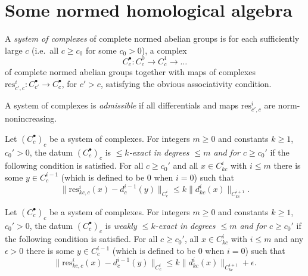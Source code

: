 \section{Some normed homological algebra}%
\label{sec:some_normed_homological_algebra}


\begin{definition}
  \label{system_of_complexes}
  \leanok
  A \emph{system of complexes} of complete normed abelian groups
  is for each sufficiently large $c$ (i.e.~all $c\geq c_0$ for some $c_0>0$),
  a complex
  \[
  C_c^\bullet: C_c^0\to C_c^1\to\ldots
  \]
  of complete normed abelian groups
  together with maps of complexes
  $\mathrm{res}_{c',c}^i: C_{c'}^\bullet\to C_c^\bullet$,
  for $c'>c$,
  satisfying the obvious associativity condition.
\end{definition}

\begin{definition}
  \label{admissible}
  \leanok
  A system of complexes is \emph{admissible}
  if all differentials and maps $\mathrm{res}_{c',c}^i$ are norm-nonincreasing.
\end{definition}

\begin{definition}
  \label{is_bdd_exact_for_bdd_degree_above_idx}
  \leanok
  Let $(C_c^\bullet)_c$ be a system of complexes.
  For integers $m\geq 0$ and constants $k \ge 1$, $c_0'>0$,
  the datum $(C_c^\bullet)_c$ is
  \emph{$\leq k$-exact in degrees $\leq m$ and for $c\geq c_0'$} if the following condition is satisfied.
  For all $c\geq c_0'$ and all $x\in C_{kc}^i$ with $i\leq m$
  there is some $y\in C_c^{i-1}$ (which is defined to be $0$ when $i=0$) such that
  \[
    \|\mathrm{res}_{kc,c}^i(x)-d_c^{i-1}(y)\|_{C_c^i}\leq k\|d_{kc}^i(x)\|_{C_{kc}^{i+1}}.
  \]
\end{definition}



\begin{definition}
  \label{is_weak_bdd_exact_for_bdd_degree_above_idx}
  \leanok
  Let $(C_c^\bullet)_c$ be a system of complexes.
  For integers $m\geq 0$ and constants $k \ge 1$, $c_0'>0$,
  the datum $(C_c^\bullet)_c$ is
  \emph{weakly $\leq k$-exact in degrees $\leq m$ and for $c\geq c_0'$} if the following condition is satisfied.
  For all $c\geq c_0'$, all $x\in C_{kc}^i$ with $i\leq m$ and any $\epsilon > 0$
  there is some $y\in C_c^{i-1}$ (which is defined to be $0$ when $i=0$) such that
  \[
    \|\mathrm{res}_{kc,c}^i(x)-d_c^{i-1}(y)\|_{C_c^i}\leq k\|d_{kc}^i(x)\|_{C_{kc}^{i+1}} + \epsilon.
  \]
\end{definition}

